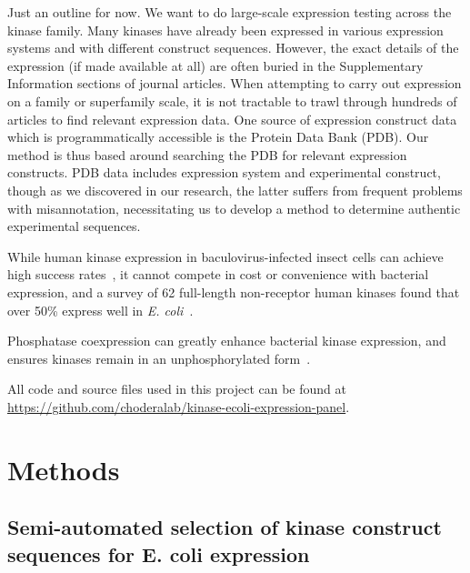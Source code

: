 \documentclass[aps,pre,twocolumn,nofootinbib,superscriptaddress,linenumbers]{revtex4-1}
\begin{document}
{\color{blue} Just an outline for now.}
We want to do large-scale expression testing across the kinase family.
Many kinases have already been expressed in various expression systems and with different construct sequences.
However, the exact details of the expression (if made available at all) are often buried in the Supplementary Information sections of journal articles.
When attempting to carry out expression on a family or superfamily scale, it is not tractable to trawl through hundreds of articles to find relevant expression data.
One source of expression construct data which is programmatically accessible is the Protein Data Bank (PDB).
Our method is thus based around searching the PDB for relevant expression constructs.
PDB data includes expression system and experimental construct, though as we discovered in our research, the latter suffers from frequent problems with misannotation, necessitating us to develop a method to determine authentic experimental sequences.

While human kinase expression in baculovirus-infected insect cells can achieve high success rates~\cite{vertex:2004:kinase-expression,wang:protein-express-pur:2008:high-yield-kinase-insect-cells}, it cannot compete in cost or convenience with bacterial expression, and a survey of 62 full-length non-receptor human kinases found that over 50\% express well in \emph{E. coli}~\cite{vertex:2004:kinase-expression}.

Phosphatase coexpression can greatly enhance bacterial kinase expression, and ensures kinases remain in an unphosphorylated form~\cite{seeliger:2005:protein-sci:kinase-expression}.

All code and source files used in this project can be found at \url{https://github.com/choderalab/kinase-ecoli-expression-panel}.

\section{Methods}
\label{section:methods}

\subsection{Semi-automated selection of kinase construct sequences for E. coli expression}
\end{document}
